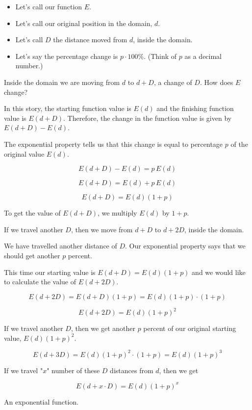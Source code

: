 \documentclass{ximera}
\begin{document}
\begin{observation}

\begin{itemize}
\item Let's call our function $E$.
\item Let's call our original position in the domain, $d$.
\item Let's call $D$ the distance moved from $d$, inside the domain.
\item Let's say the percentage change is $p \cdot 100\%$. (Think of $p$ as a decimal number.)
\end{itemize}



Inside the domain we are moving from $d$ to $d + D$, a change of $D$.  How does $E$ change?



In this story, the starting function value is $E(d)$ and the finishing function value is $E(d+D)$.  Therefore, the change in the function value is given by $E(d+D) - E(d)$.

The exponential property tells us that this change is equal to percentage $p$ of the original value $E(d)$.



\[
E(d+D) - E(d) = p \, E(d)
\]

\[
E(d+D) = E(d) + p \, E(d)
\]


\[
E(d+D) = E(d) (1+p)
\]



To get the value of $E(d+D)$, we multiply $E(d)$ by $1+p$. 









If we travel another $D$, then we move from $d+D$ to $d+2D$, inside the domain. 

We have travelled another distance of $D$. Our exponential property says that we should get another $p$ percent.



This time our starting value is $E(d+D) = E(d) (1+p)$ and we would like to calculate the value of $E(d+2D)$. 




\[
E(d + 2D) = E(d+D)(1+p)  = E(d) (1+p) \cdot (1+p)
\]



\[
E(d + 2D) =  E(d) (1+p)^2
\]


If we travel another $D$, then we get another $p$ percent of our original starting value, $E(d)(1+p)^2$.


\[
E(d + 3D) = E(d)(1+p)^2 \cdot (1+p) = E(d) (1+p)^3
\]



If we travel "$x$" number of these $D$ distances from $d$, then we get

\[
E(d + x \cdot D) = E(d)(1+p)^x 
\]

An exponential function.

\end{observation}
\end{document}
